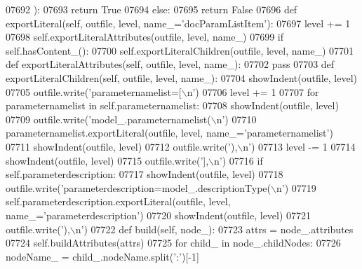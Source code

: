 \begin{DoxyCode}
{{{{{{{{{{{{{{{{{{{{{{{{{{{{{{{{{{{{{{{{{{{{{{{{{{{{{{{{{{{{{{{{{{{{{{{{{{{{{{{{{{{{{{{{{{{{{{{{{{{{{{{{{{{{{{{{{{{{{{{{{{{{{{{{{{{{{{{{{{{{{{{{{{{{{{{{{{{{{{{{{{{{{{{{{{{{{{{{{{{{{{{{{{{{{{{{{{{{{{{{{{{{{{{{{{{{{{{{{{{{{{{{{{{{{{{{{{{{{{{{{{{{{{{{{{{{{{{{{{{{{{{{{{{{{{{{{{{{{{{{{{{{{{{{{{{{{{{{{{{{{{{{{{{{{{{{{{{{{{{{{{{{{{{{{{{{{{{{{{{{{{{{{{{{{{{{{{{{{{{{{{{{{{{{{{{{{{{{{{{{{{{{{{{{{{{{{{{{{{{{{{{{{{{{{{{{{{{{{{{{{{{{{{{{{{{{{{{{{{{{{{{{{{{{{{{{{{{{{{{{{{{{{{{{{{{{{{{{{{{{07692             ):
07693             \textcolor{keywordflow}{return} \textcolor{keyword}{True}
07694         \textcolor{keywordflow}{else}:
07695             \textcolor{keywordflow}{return} \textcolor{keyword}{False}
07696     \textcolor{keyword}{def }exportLiteral(self, outfile, level, name\_='docParamListItem'):
07697         level += 1
07698         self.exportLiteralAttributes(outfile, level, name\_)
07699         \textcolor{keywordflow}{if} self.hasContent_():
07700             self.exportLiteralChildren(outfile, level, name\_)
07701     \textcolor{keyword}{def }exportLiteralAttributes(self, outfile, level, name\_):
07702         \textcolor{keywordflow}{pass}
07703     \textcolor{keyword}{def }exportLiteralChildren(self, outfile, level, name\_):
07704         showIndent(outfile, level)
07705         outfile.write(\textcolor{stringliteral}{'parameternamelist=[\(\backslash\)n'})
07706         level += 1
07707         \textcolor{keywordflow}{for} parameternamelist \textcolor{keywordflow}{in} self.parameternamelist:
07708             showIndent(outfile, level)
07709             outfile.write(\textcolor{stringliteral}{'model\_.parameternamelist(\(\backslash\)n'})
07710             parameternamelist.exportLiteral(outfile, level, name\_=\textcolor{stringliteral}{'parameternamelist'})
07711             showIndent(outfile, level)
07712             outfile.write(\textcolor{stringliteral}{'),\(\backslash\)n'})
07713         level -= 1
07714         showIndent(outfile, level)
07715         outfile.write(\textcolor{stringliteral}{'],\(\backslash\)n'})
07716         \textcolor{keywordflow}{if} self.parameterdescription:
07717             showIndent(outfile, level)
07718             outfile.write(\textcolor{stringliteral}{'parameterdescription=model\_.descriptionType(\(\backslash\)n'})
07719             self.parameterdescription.exportLiteral(outfile, level, name\_=\textcolor{stringliteral}{'parameterdescription'})
07720             showIndent(outfile, level)
07721             outfile.write(\textcolor{stringliteral}{'),\(\backslash\)n'})
07722     \textcolor{keyword}{def }build(self, node\_):
07723         attrs = node\_.attributes
07724         self.buildAttributes(attrs)
07725         \textcolor{keywordflow}{for} child\_ \textcolor{keywordflow}{in} node\_.childNodes:
07726             nodeName\_ = child\_.nodeName.split(\textcolor{stringliteral}{':'})[-1]
}}}}}}}}}}}}}}}}}}}}}}}}}}}}}}}}}}}}}}}}}}}}}}}}}}}}}}}}}}}}}}}}}}}}}}}}}}}}}}}}}}}}}}}}}}}}}}}}}}}}}}}}}}}}}}}}}}}}}}}}}}}}}}}}}}}}}}}}}}}}}}}}}}}}}}}}}}}}}}}}}}}}}}}}}}}}}}}}}}}}}}}}}}}}}}}}}}}}}}}}}}}}}}}}}}}}}}}}}}}}}}}}}}}}}}}}}}}}}}}}}}}}}}}}}}}}}}}}}}}}}}}}}}}}}}}}}}}}}}}}}}}}}}}}}}}}}}}}}}}}}}}}}}}}}}}}}}}}}}}}}}}}}}}}}}}}}}}}}}}}}}}}}}}}}}}}}}}}}}}}}}}}}}}}}}}}}}}}}}}}}}}}}}}}}}}}}}}}}}}}}}}}}}}}}}}}}}}}}}}}}}}}}}}}}}}}}}}}}}}}}}}}}}}}}}}}}}}}}}}}}}}}}}}}}}}}}}}}}}}}
\end{DoxyCode}
